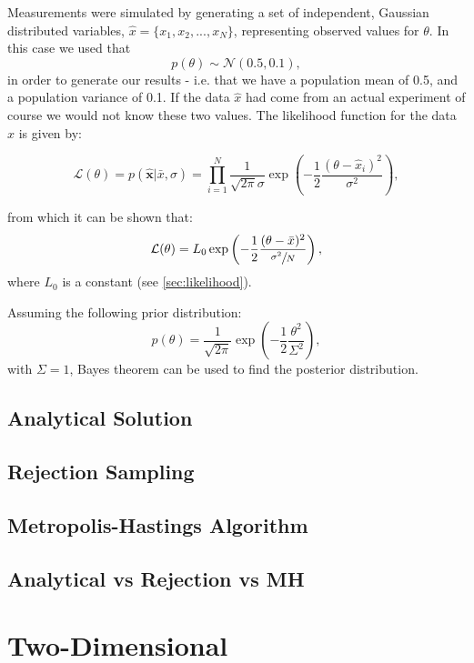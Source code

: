 \documentclass[a4paper,11pt,twoside]{article}
\begin{document}
Measurements were simulated by generating a set of
independent, Gaussian distributed variables, $\hat{x} = \{x_1, x_2, ...,
x_N\}$, representing observed values for $\theta$. In this
case we used that
\begin{equation}
	\label{eq:measurements}
	p(\theta) \sim \mathcal{N}(0.5, 0.1),
\end{equation}
in order to generate our results - i.e. that we have a population mean of 0.5,
and a population variance of 0.1. If the data $\hat{x}$ had come from an actual
experiment of course we would not know these two values.
The likelihood function for the data $\hat{x}$ is given by:

\begin{equation}
	\label{eq:rawlikelihood}
	\mathcal{L}(\theta) = p(\hat{\mathbf{x}}|\bar{x},\sigma) = \prod_{i=1}^{N} \frac{1}{\sqrt{2\pi}\sigma}\exp\left(-\frac{1}{2}\frac{(\theta - \hat{x}_i)^2}{\sigma^2}\right),
\end{equation}

from which it can be shown that:
\begin{equation}
	\label{eq:likelihood}
	\mathcal{L}(\theta) = L_0\exp\left(-\frac{1}{2}\frac{(\theta - \bar{x})^2}{\sfrac{\sigma^2}{N}}\right),
\end{equation}
where $L_0$ is a constant (see \cref{sec:likelihood}).

Assuming the following prior distribution:
\begin{equation}
	\label{eq:prior}
	p(\theta) =  \frac{1}{\sqrt{2\pi}}\exp\left(-\frac{1}{2}\frac{\theta^2}{\Sigma^2}\right),
\end{equation}
with $\Sigma = 1$, Bayes theorem can be used to find the posterior distribution.
\subsection{Analytical Solution}
\subsection{Rejection Sampling} 
\subsection{Metropolis-Hastings Algorithm} 
\subsection{Analytical vs Rejection vs MH}

\section{Two-Dimensional} 
\end{document}
